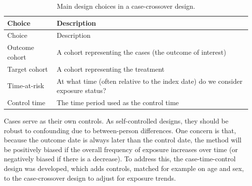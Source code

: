 \documentclass[]{book}
\begin{document}
\begin{longtable}[]{@{}ll@{}}
\caption{\label{tab:ccrChoices} Main design choices in a case-crossover design.}\tabularnewline
\toprule
\begin{minipage}[b]{0.23\columnwidth}\raggedright
Choice\strut
\end{minipage} & \begin{minipage}[b]{0.72\columnwidth}\raggedright
Description\strut
\end{minipage}\tabularnewline
\midrule
\endfirsthead
\toprule
\begin{minipage}[b]{0.23\columnwidth}\raggedright
Choice\strut
\end{minipage} & \begin{minipage}[b]{0.72\columnwidth}\raggedright
Description\strut
\end{minipage}\tabularnewline
\midrule
\endhead
\begin{minipage}[t]{0.23\columnwidth}\raggedright
Outcome cohort\strut
\end{minipage} & \begin{minipage}[t]{0.72\columnwidth}\raggedright
A cohort representing the cases (the outcome of interest)\strut
\end{minipage}\tabularnewline
\begin{minipage}[t]{0.23\columnwidth}\raggedright
Target cohort\strut
\end{minipage} & \begin{minipage}[t]{0.72\columnwidth}\raggedright
A cohort representing the treatment\strut
\end{minipage}\tabularnewline
\begin{minipage}[t]{0.23\columnwidth}\raggedright
Time-at-risk\strut
\end{minipage} & \begin{minipage}[t]{0.72\columnwidth}\raggedright
At what time (often relative to the index date) do we consider exposure status?\strut
\end{minipage}\tabularnewline
\begin{minipage}[t]{0.23\columnwidth}\raggedright
Control time\strut
\end{minipage} & \begin{minipage}[t]{0.72\columnwidth}\raggedright
The time period used as the control time\strut
\end{minipage}\tabularnewline
\bottomrule
\end{longtable}

Cases serve as their own controls. As self-controlled designs, they should be robust to confounding due to between-person differences. One concern is that, because the outcome date is always later than the control date, the method will be positively biased if the overall frequency of exposure increases over time (or negatively biased if there is a decrease). To address this, the case-time-control design \citep{suissa_1995} was developed, which adds controls, matched for example on age and sex, to the case-crossover design to adjust for exposure trends. 
\end{document}
